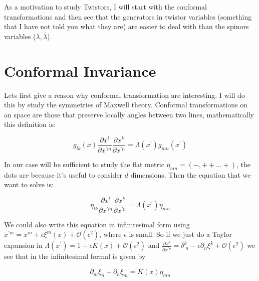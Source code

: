 



As a motivation to study Twistors, I will start with the conformal transformations and then see that the generators in twistor variables (something that I have not told you what they are) are easier to deal with than the spinors variables ($\lambda,\bar{\lambda}$). 



\section{Conformal Invariance}

Lets first give a reason why conformal transformation are interesting. I will do this by study the symmetries of Maxwell theory. Conformal transformations on an space are those that preserve locally angles between two lines, mathematically this definition is:

\begin{equation}
g_{lk}(x) \frac{\partial x^{l}}{\partial x^{'m}}\frac{\partial x^{k}}{\partial x^{'n}} = \Lambda(x^{'})g_{mn}(x^{'})
\end{equation}

In our case will be sufficient to study the flat metric $\eta_{mn} = (-,++...+)$, the dots are because it's useful to consider $d$ dimensions. Then the equation that we want to solve is:

\begin{equation}
\eta_{lk} \frac{\partial x^{l}}{\partial x^{'m}}\frac{\partial x^{k}}{\partial x^{'n}} = \Lambda(x^{'})\eta_{mn}
\label{eq.3.2}
\end{equation}

We could also write this equation in infinitesimal form using $x^{'m} = x^{m} + \epsilon \xi^{m}(x) + \mathcal O (\epsilon^{2})$, where $\epsilon$ is small. So if we just do a Taylor expansion in  $\Lambda(x^{'}) = 1 - \epsilon K(x) +\mathcal O (\epsilon^{2}) $ and $\frac{\partial x^{k}}{\partial x^{'n}} = \delta ^{k}_{\; n} - \epsilon\partial_{n}\xi^{k} +\mathcal O (\epsilon^{2}) $ we see that in the infinitesimal formal is given by

\begin{equation}
\partial_{m}\xi_{n} + \partial_{n}\xi_{m} = K(x)\eta_{mn}
\end{equation}

